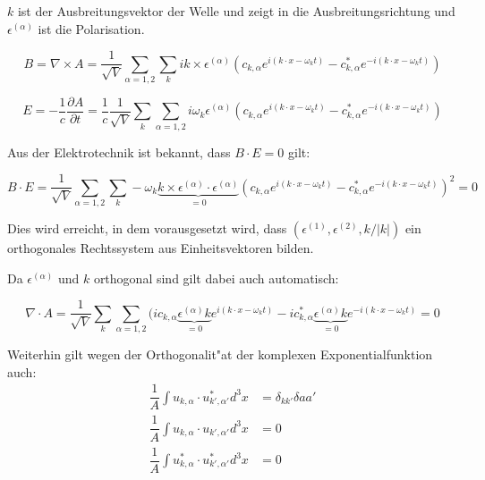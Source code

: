 $k$ ist der Ausbreitungsvektor der Welle und zeigt in die Ausbreitungsrichtung und $\epsilon^{(\alpha)}$ ist die Polarisation. 

\begin{equation}
B = \nabla \times A = \frac{1}{ \sqrt{V}} \sum_{\alpha=1,2}  \sum_k ik \times \epsilon^{(\alpha)} (c_{k,\alpha} e^{i (k \cdot x - \omega_k t)} - c^*_{k,\alpha} e^{-i(k \cdot x - \omega_k t)})
\end{equation}

\begin{equation}
E = -\frac{1}{c} \frac{\partial A}{\partial t} = \frac{1}{c} \frac{1}{\sqrt{V}} \sum_k \sum_{\alpha=1,2} i \omega_k \epsilon^{(\alpha)} (c_{k,\alpha} e^{i (k \cdot x - \omega_k t)} - c^*_{k,\alpha} e^{-i(k \cdot x - \omega_k t)})
\end{equation}

Aus der Elektrotechnik ist bekannt, dass $B \cdot E = 0$ gilt:

\begin{equation}
B \cdot E = \frac{1}{\sqrt{V}} \sum_{\alpha=1,2}   \sum_k -\omega_k \underbrace{k \times  \epsilon^{(\alpha)} \cdot \epsilon^{(\alpha)}}_{=0} (c_{k,\alpha} e^{i (k \cdot x - \omega_k t)} - c^*_{k,\alpha} e^{-i(k \cdot x - \omega_k t)})^2 = 0
\end{equation}

Dies wird erreicht, in dem vorausgesetzt wird, dass $(\epsilon^{(1)}, \epsilon^{(2)} , k/|k|)$ ein orthogonales Rechtssystem aus Einheitsvektoren bilden.

Da $\epsilon^{(\alpha)}$ und $k$ orthogonal sind gilt dabei auch automatisch:

\begin{equation}
\nabla \cdot A = \frac{1}{\sqrt{V}} \sum_k \sum_{\alpha=1,2} (i c_{k,\alpha} \underbrace{\epsilon^{(\alpha)} k}_{=0} e^{i (k \cdot x - \omega_k t)} - i c^*_{k,\alpha} \underbrace{\epsilon^{(\alpha)} k}_{=0} e^{-i(k \cdot x - \omega_k t)} = 0
\end{equation}

Weiterhin gilt wegen der Orthogonalit"at der komplexen Exponentialfunktion auch:
\begin{equation}
\begin{split}
\dfrac{1}{A} \int u_{k,\alpha} \cdot u^*_{k',\alpha'} d^3 x &= \delta_{kk'}\delta{aa'} \\
\dfrac{1}{A} \int u_{k,\alpha} \cdot u_{k',\alpha'} d^3 x &= 0 \\
\dfrac{1}{A} \int u^*_{k,\alpha} \cdot u^*_{k',\alpha'} d^3 x &= 0
\end{split}
\end{equation}


